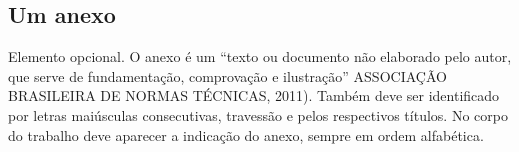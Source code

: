 \begin{anexosenv}
\partanexos

	\chapter{Um anexo}
	
	Elemento opcional. O anexo é um “texto ou documento não elaborado pelo autor, que serve de fundamentação, comprovação e ilustração” ASSOCIAÇÃO BRASILEIRA DE NORMAS TÉCNICAS, 2011). Também deve ser identificado por letras maiúsculas consecutivas, travessão e pelos respectivos títulos. No corpo do trabalho deve aparecer a indicação do anexo,
	sempre em ordem alfabética. 

\end{anexosenv}